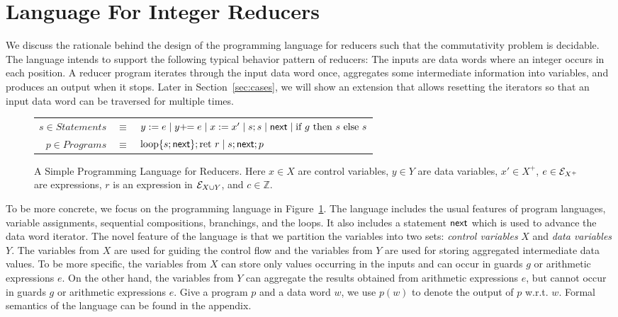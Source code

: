  
\section{Language For Integer Reducers}\label{sec-mr-prog}
\label{sec:language}
We discuss the rationale behind the design of the programming language for reducers such that the commutativity problem is decidable. The language intends to support the following typical behavior pattern of reducers: The inputs are data words where an integer occurs in each position. A reducer program iterates through the input data word once, aggregates some intermediate information into variables, and produces an output when it stops. 
%
Later in Section~\ref{sec:cases}, we will show an extension that allows resetting the iterators so that an input data word can be traversed for multiple times.

\begin{figure}
	\vspace{-0.5cm}
	\centering
	\begin{tabular}{rcl}
        $ s \in Statements$&$\equiv$&$y := e\mid y +\!\!= e \mid x:=x'\mid s;s\mid \mathsf{next} \mid \mbox{if } g \mbox{ then } s\mbox{ else }s$\\
		$ p\in Programs$&$\equiv$&$\mbox{loop\{} s;\mathsf{next}\mbox{\}};\mbox{ret }r \mid s;\mathsf{next};p$		
	\end{tabular}
	\label{fig:language}
	\caption{A Simple Programming Language for Reducers. Here $x\in X$ are control variables, $y\in Y$ are data variables, $x' \in X^+$, $e\in {\mathcal{E} }_{X^+}$ are expressions, $r$ is an expression in ${\mathcal{E} }_{X \cup Y}$, and $c\in \mathbb{Z}$.}
	\vspace{-0.5cm}
\end{figure}

To be more concrete, we focus on the programming language in Figure~\ref{fig:language}. The language includes the usual features of program languages, variable assignments, sequential compositions, branchings, and the loops. It also includes a statement $\mathsf{next}$ which is used to advance the data word iterator.
The novel feature of the language is that we partition the variables into two sets: \emph{control variables} $X$ and \emph{data variables} $Y$.
The variables from $X$ are used for guiding the control flow and the variables from $Y$ are used for storing aggregated intermediate data values.
To be more specific, the variables from $X$ can store only values occurring in the inputs and can occur in guards $g$ or arithmetic expressions $e$.
On the other hand, the variables from $Y$ can aggregate the results obtained from arithmetic expressions $e$, but cannot occur in guards $g$ or arithmetic expressions $e$.
Give a program $p$ and a data word $w$, we use $p(w)$ to denote the output of $p$ w.r.t. $w$. Formal semantics of the language can be found in the appendix.

